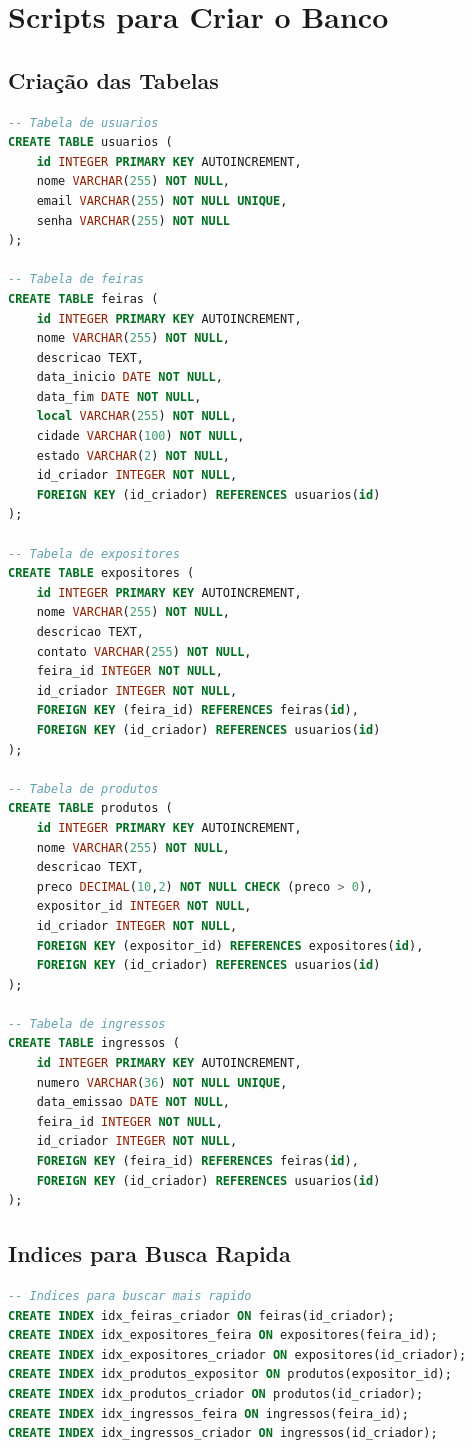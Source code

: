 \documentclass[12pt,a4paper]{article}
\begin{document}
\newpage

\section{Scripts para Criar o Banco}

\subsection{Criação das Tabelas}

\begin{lstlisting}[language=SQL, caption=Como criar as tabelas]
-- Tabela de usuarios
CREATE TABLE usuarios (
    id INTEGER PRIMARY KEY AUTOINCREMENT,
    nome VARCHAR(255) NOT NULL,
    email VARCHAR(255) NOT NULL UNIQUE,
    senha VARCHAR(255) NOT NULL
);

-- Tabela de feiras
CREATE TABLE feiras (
    id INTEGER PRIMARY KEY AUTOINCREMENT,
    nome VARCHAR(255) NOT NULL,
    descricao TEXT,
    data_inicio DATE NOT NULL,
    data_fim DATE NOT NULL,
    local VARCHAR(255) NOT NULL,
    cidade VARCHAR(100) NOT NULL,
    estado VARCHAR(2) NOT NULL,
    id_criador INTEGER NOT NULL,
    FOREIGN KEY (id_criador) REFERENCES usuarios(id)
);

-- Tabela de expositores
CREATE TABLE expositores (
    id INTEGER PRIMARY KEY AUTOINCREMENT,
    nome VARCHAR(255) NOT NULL,
    descricao TEXT,
    contato VARCHAR(255) NOT NULL,
    feira_id INTEGER NOT NULL,
    id_criador INTEGER NOT NULL,
    FOREIGN KEY (feira_id) REFERENCES feiras(id),
    FOREIGN KEY (id_criador) REFERENCES usuarios(id)
);

-- Tabela de produtos
CREATE TABLE produtos (
    id INTEGER PRIMARY KEY AUTOINCREMENT,
    nome VARCHAR(255) NOT NULL,
    descricao TEXT,
    preco DECIMAL(10,2) NOT NULL CHECK (preco > 0),
    expositor_id INTEGER NOT NULL,
    id_criador INTEGER NOT NULL,
    FOREIGN KEY (expositor_id) REFERENCES expositores(id),
    FOREIGN KEY (id_criador) REFERENCES usuarios(id)
);

-- Tabela de ingressos
CREATE TABLE ingressos (
    id INTEGER PRIMARY KEY AUTOINCREMENT,
    numero VARCHAR(36) NOT NULL UNIQUE,
    data_emissao DATE NOT NULL,
    feira_id INTEGER NOT NULL,
    id_criador INTEGER NOT NULL,
    FOREIGN KEY (feira_id) REFERENCES feiras(id),
    FOREIGN KEY (id_criador) REFERENCES usuarios(id)
);
\end{lstlisting}

\subsection{Indices para Busca Rapida}

\begin{lstlisting}[language=SQL, caption=Indices para melhorar a velocidade]
-- Indices para buscar mais rapido
CREATE INDEX idx_feiras_criador ON feiras(id_criador);
CREATE INDEX idx_expositores_feira ON expositores(feira_id);
CREATE INDEX idx_expositores_criador ON expositores(id_criador);
CREATE INDEX idx_produtos_expositor ON produtos(expositor_id);
CREATE INDEX idx_produtos_criador ON produtos(id_criador);
CREATE INDEX idx_ingressos_feira ON ingressos(feira_id);
CREATE INDEX idx_ingressos_criador ON ingressos(id_criador);
\end{lstlisting}
\end{document}
